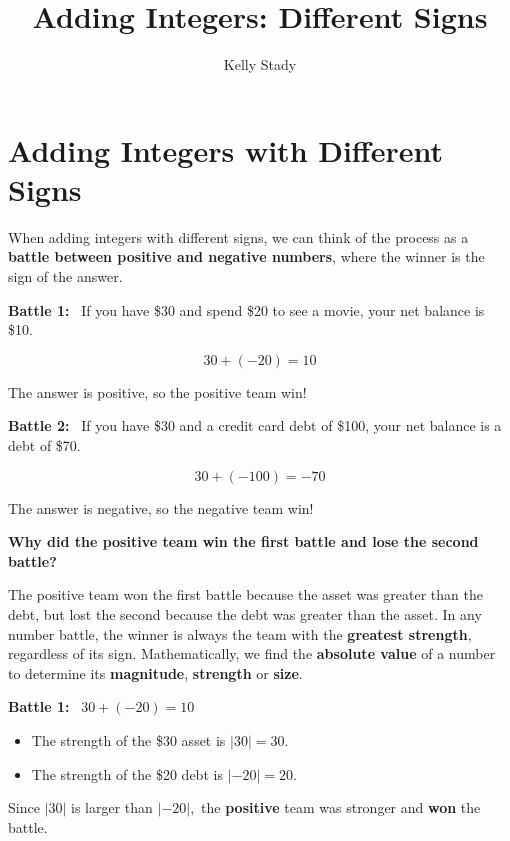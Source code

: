 \documentclass{ximera}[font=12pt]
\title{Adding Integers: Different Signs}   %
\author{Kelly Stady}
\begin{document}
\begin{abstract}

\end{abstract}

\maketitle
\label{xim:AddIntDiffSActivity}


\section*{Adding Integers with Different Signs}

When adding integers with different signs, we can think of the process as a
\textbf{battle between positive and negative numbers}, where the winner is the sign of
the answer.


\textcolor{orange!80!black}{\textbf{Battle 1:}}  \ If you have \$30 and spend \$20 to see a movie, your net balance is \$10. 

\[ 30 + (-20) = 10 \]

The answer is positive, so the positive team win!


\textcolor{orange!80!black}{\textbf{Battle 2:}} \ If you have \$30 and a credit card debt of \$100, your net balance is a debt of \$70.


\[ 30 + (-100) = -70 \]

The answer is negative, so the negative team win!

\textbf{Why did the positive team win the first battle and lose the second battle?}

The positive team won the first battle because the asset was greater than the debt, but 
lost the second because the debt was greater than the asset.  In any number battle, the winner is always 
the team with the \textbf{greatest strength}, regardless of its sign.  Mathematically, we find the \textbf{absolute value} 
of a number to determine its \textbf{magnitude}, \textbf{strength} or \textbf{size}.  


\textcolor{orange!80!black}{\textbf{Battle 1:}} \ $30 + (-20) = 10$  
\begin{itemize}
    \item[] The strength of the \$30 asset is $|30| = 30$.
    \item[] The strength of the \$20 debt is $|-20| = 20$.
\end{itemize}


Since $|30|$ is larger than $|-20|,$ the \textbf{positive} team was stronger and \textbf{won} the battle.
\end{document}

